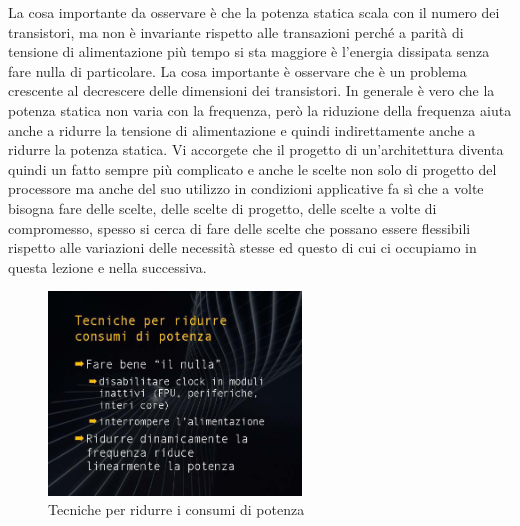 La cosa importante da osservare è che la potenza statica scala con il numero dei transistori, ma non è invariante rispetto alle transazioni perché a parità di tensione di alimentazione più tempo si sta maggiore è l'energia dissipata senza fare nulla di particolare.
La cosa importante è osservare che è un problema crescente al decrescere delle dimensioni dei transistori.
In generale è vero che la potenza statica non varia con la frequenza, però la riduzione della frequenza aiuta anche a ridurre la tensione di alimentazione e quindi indirettamente anche a ridurre la potenza statica.
Vi accorgete che il progetto di un'architettura diventa quindi un fatto sempre più complicato e anche le scelte non solo di progetto del processore ma anche del suo utilizzo in condizioni applicative fa sì che a volte bisogna fare delle scelte, delle scelte di progetto, delle scelte a volte di compromesso, spesso si cerca di fare delle scelte che possano essere flessibili rispetto alle variazioni delle necessità stesse ed questo di cui ci occupiamo in questa lezione e nella successiva.

\begin{figure}[H]
  \centering
  \includegraphics[width=0.6\textwidth,
                    trim=40 40 45 40, %
                    clip]{images/Lez02_p02_fig_01.png}
  \caption{Tecniche per ridurre i consumi di potenza}
  \label{fig:Lez02_p02_fig_01}
\end{figure}

